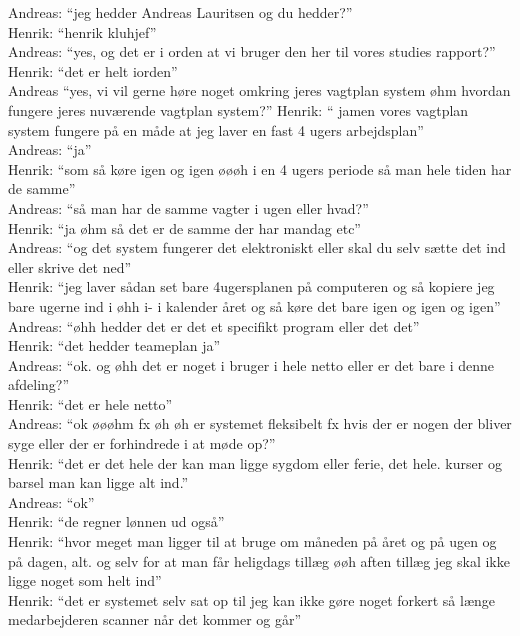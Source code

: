 Andreas: “jeg hedder Andreas Lauritsen og du hedder?”\\
Henrik: “henrik kluhjef”\\
Andreas: “yes, og det er i orden at vi bruger den her til vores studies rapport?”\\
Henrik: “det er helt iorden”\\
Andreas “yes, vi vil gerne høre noget omkring jeres vagtplan system øhm hvordan fungere jeres nuværende vagtplan system?”
Henrik: “ jamen vores vagtplan system fungere på en måde at jeg laver en fast 4 ugers arbejdsplan”\\
Andreas: “ja”\\
Henrik: “som så køre igen og igen øøøh i en 4 ugers periode så man hele tiden har de samme”\\
Andreas: “så man har de samme vagter i ugen eller hvad?”\\
Henrik: “ja øhm så det er de samme der har mandag etc”\\
Andreas: “og det system fungerer det elektroniskt eller skal du selv sætte det ind eller skrive det ned”\\
Henrik: “jeg laver sådan set bare 4ugersplanen på computeren og så kopiere jeg bare ugerne ind i øhh i- i kalender året og så køre det bare igen og igen og igen”\\
Andreas: “øhh hedder det er det et specifikt program eller det det”\\
Henrik: “det hedder teameplan ja”\\
Andreas: “ok. og øhh det er noget i bruger i hele netto eller er det bare i denne afdeling?”\\
Henrik: “det er hele netto”\\
Andreas: “ok øøøhm fx øh øh er systemet fleksibelt fx hvis der er nogen der bliver syge eller der er forhindrede i at møde op?”\\
Henrik: “det er det hele der kan man ligge sygdom eller ferie, det hele. kurser og barsel man kan ligge alt ind.”\\
Andreas: “ok”\\
Henrik: “de regner lønnen ud også”\\
Henrik: “hvor meget man ligger til at bruge om måneden på året og på ugen og på dagen, alt. og selv for at man får heligdags tillæg øøh aften tillæg jeg skal ikke ligge noget som helt ind”\\
Henrik: “det er systemet selv sat op til jeg kan ikke gøre noget forkert så længe medarbejderen scanner når det kommer og går”\\
